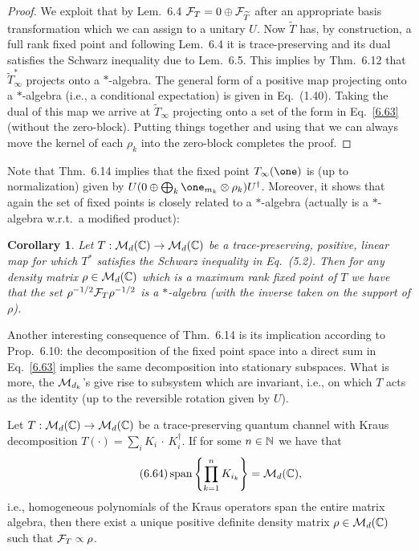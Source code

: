 \documentclass[11pt,a4paper]{article}
\theoremstyle{plain}
\newtheorem{corollary}{Corollary}[section]
\theoremstyle{definition}
\theoremstyle{remark}
\begin{document}
\begin{proof}
    We exploit that by Lem.~6.4 $\mathcal{F}_T = 0\oplus \mathcal{F}_{\widetilde{T}}$ after an
    appropriate basis transformation which we can assign to a unitary $U$. Now
    $\widetilde{T}$ has, by construction, a full rank fixed point and following
    Lem.~6.4 it is trace-preserving and its dual satisfies the Schwarz inequality
    due to Lem.~6.5. This implies by Thm.~6.12 that $\widetilde{T}_\infty^*$ projects
    onto a $*$-algebra. The general form of a positive map projecting onto a
    $*$-algebra (i.e., a conditional expectation) is given in Eq.~(1.40). Taking the
    dual of this map we arrive at $\widetilde{T}_\infty$ projecting onto a set of the
    form in Eq.~\eqref{6.63} (without the zero-block). Putting things together and
    using that we can always move the kernel of each $\rho_k$ into the zero-block
    completes the proof.
\end{proof}

Note that Thm.~6.14 implies that the fixed point $T_\infty(\one)$ is (up to
normalization) given by
$U(0 \oplus \bigoplus_k \one_{m_k}\otimes \rho_k)U^\dagger$. Moreover,
it shows that again the set of fixed points is closely related to a $*$-algebra
(actually is a $*$-algebra w.r.t.\ a modified product):

\begin{corollary}
    Let $T:\mathcal{M}_d(\mathbb{C})\to\mathcal{M}_d(\mathbb{C})$ be a trace-preserving, positive, linear map for
    which $T^*$ satisfies the Schwarz inequality in Eq.~(5.2). Then for any density
    matrix $\rho\in\mathcal{M}_d(\mathbb{C})$ which is a maximum rank fixed point of $T$ we have
    that the set $\rho^{-1/2}\mathcal{F}_T\rho^{-1/2}$ is a $*$-algebra (with the inverse taken
    on the support of $\rho$).
\end{corollary}

Another interesting consequence of Thm.~6.14 is its implication according to
Prop.~6.10: the decomposition of the fixed point space into a direct sum in
Eq.~\eqref{6.63} implies the same decomposition into stationary subspaces. What
is more, the $\mathcal{M}_{d_k}$'s give rise to subsystem which are invariant, i.e., on
which $T$ acts as the identity (up to the reversible rotation given by $U$).

\begin{theorem}
    Let $T:\mathcal{M}_d(\mathbb{C})\to\mathcal{M}_d(\mathbb{C})$ be a trace-preserving quantum channel with Kraus
    decomposition $T(\cdot)=\sum_i K_i\,\cdot\,K_i^\dagger$. If for some $n\in\mathbb{N}$ we
    have that
    \begin{equation}\tag{6.64}
        \operatorname{span}\left\{\prod_{k=1}^n K_{i_k}\right\}=\mathcal{M}_d(\mathbb{C}),
    \end{equation}
    i.e., homogeneous polynomials of the Kraus operators span the entire matrix
    algebra, then there exist a unique positive definite density matrix
    $\rho\in\mathcal{M}_d(\mathbb{C})$ such that $\mathcal{F}_T\propto \rho$.
\end{theorem}
\end{document}
